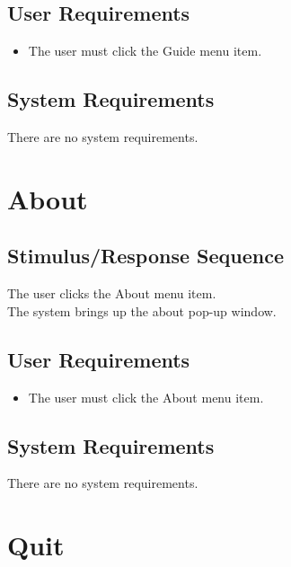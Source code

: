 \documentclass{scrreprt}
\begin{document}
    \subsection{User Requirements}
        \begin{itemize}
            \item The user must click the Guide menu item.
        \end{itemize}

    \subsection{System Requirements}
        There are no system requirements.

\section{About}
    \subsection{Stimulus/Response Sequence}
        \begin{flushleft}
             The user clicks the About menu item. \\
             The system brings up the about pop-up window. \\
        \end{flushleft}

    \subsection{User Requirements}
        \begin{itemize}
            \item The user must click the About menu item.
        \end{itemize}

    \subsection{System Requirements}
        There are no system requirements.

\section{Quit}
\end{document}
